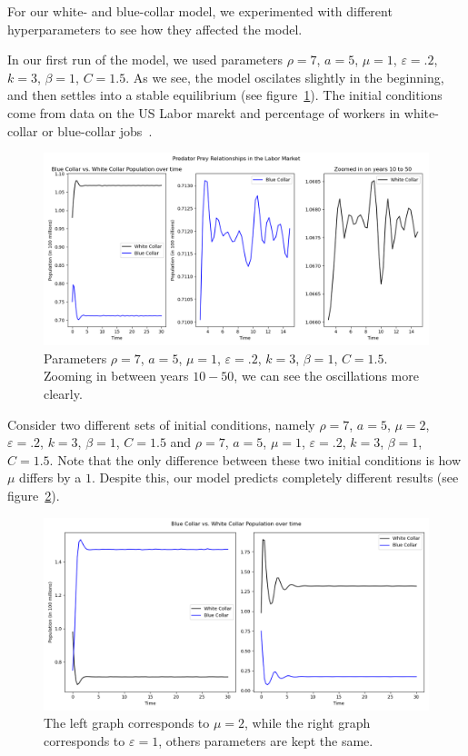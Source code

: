 \documentclass[11pt]{amsart}
\begin{document}
For our white- and blue-collar model, we experimented with different hyperparameters to see how they affected the model. 

In our first run of the model, we used parameters $\rho = 7$, $a = 5$, $\mu = 1$, $\varepsilon = .2$, $k = 3$, $\beta = 1$, $C = 1.5$. As we see, the model oscilates
slightly in the beginning, and then settles into a stable equilibrium (see figure~\ref{fig:results_wb_1}). The initial conditions come from data on the US Labor marekt and percentage of workers in white-collar or blue-collar jobs~\cite{BLS}.

\begin{figure}[h]
    \centering
    \includegraphics[width=.8\textwidth]{figures/blue_vs_white2.png}
    \caption{Parameters $\rho = 7$, $a = 5$, $\mu = 1$, $\varepsilon = .2$, $k = 3$, $\beta = 1$, $C = 1.5$. Zooming in between years $10-50$, we can see the oscillations more clearly.}
    \label{fig:results_wb_1}
\end{figure}


Consider two different sets of initial conditions, namely $\rho = 7$, $a = 5$, $\mu = 2$, $\varepsilon = .2$, $k = 3$, $\beta = 1$, $C = 1.5$ and 
$\rho = 7$, $a = 5$, $\mu = 1$, $\varepsilon = .2$, $k = 3$, $\beta = 1$, $C = 1.5$. Note that the only difference between these two initial conditions is
how $\mu$ differs by a $1$. Despite this, our model predicts completely different results (see figure~\ref{fig:results_wb_3}).

\begin{figure}[h]
    \centering
    \includegraphics[width=.8\textwidth]{figures/bad_paramenters.png}
    \caption{The left graph corresponds to $\mu = 2$, while the right graph corresponds to $\varepsilon = 1$, others parameters are kept the same.}
    \label{fig:results_wb_3}
\end{figure}
\end{document}
